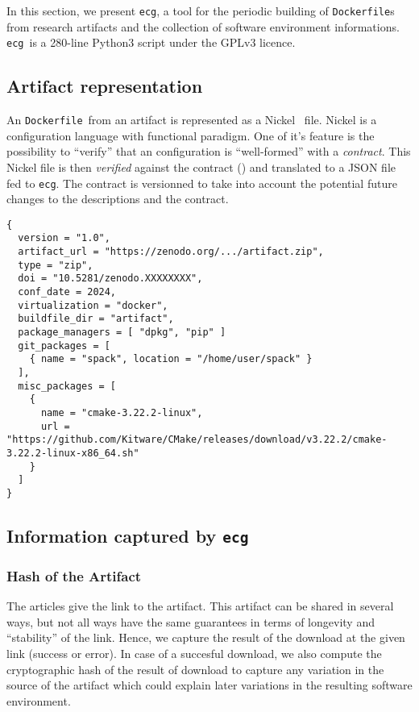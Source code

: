 \documentclass[sigconf,natbib=false]{acmart}
\newcommand{\df}{\texttt{Dockerfile}}
\newcommand{\ecg}{\texttt{ecg}}
\newcommand{\todo}[1]{{\color{red}{TODO: #1}}}
\begin{document}
In this section, we present \ecg, a tool for the periodic building of \df s from research artifacts and the collection of software environment informations.
\ecg\ is a 280-line Python3 script under the GPLv3 licence.

\subsection{Artifact representation}\label{sec:nickel}

An \df\ from an artifact is represented as a Nickel~\cite{nickel} file.
Nickel is a configuration language with functional paradigm.
One of it's feature is the possibility to ``verify'' that an configuration is ``well-formed'' with a \emph{contract}.
This Nickel file is then \emph{verified} against the contract (\todo{link to contract}) and translated to a JSON file fed to \ecg.
The contract is versionned to take into account the potential future changes to the descriptions and the contract.

\begin{lstlisting}[caption=Example of Artifact Nickel representation]
{
  version = "1.0",
  artifact_url = "https://zenodo.org/.../artifact.zip",
  type = "zip",
  doi = "10.5281/zenodo.XXXXXXXX",
  conf_date = 2024,
  virtualization = "docker",
  buildfile_dir = "artifact",
  package_managers = [ "dpkg", "pip" ]
  git_packages = [
    { name = "spack", location = "/home/user/spack" }
  ],
  misc_packages = [
    {
      name = "cmake-3.22.2-linux",
      url = "https://github.com/Kitware/CMake/releases/download/v3.22.2/cmake-3.22.2-linux-x86_64.sh"
    }
  ]
}
\end{lstlisting}


\subsection{Information captured by \ecg}\label{sec:ecg:capture}

\subsubsection{Hash of the Artifact}

The articles give the link to the artifact.
This artifact can be shared in several ways, but not all ways have the same guarantees in terms of longevity and ``stability'' of the link.
Hence, we capture the result of the download at the given link (success or error).
In case of a succesful download, we also compute the cryptographic hash of the result of download to capture any variation in the source of the artifact which could explain later variations in the resulting software environment.
\end{document}
